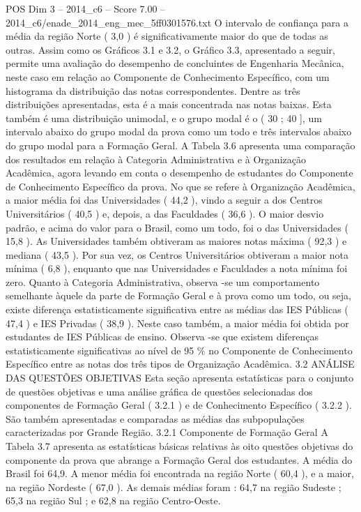 \begin{textsample}{POS Dim 3 – 2014\_c6 – Score 7.00 – 2014\_c6/enade\_2014\_eng\_mec\_5ff0301576.txt}
O intervalo de confiança para a média da região Norte ( 3,0 ) é significativamente maior do que de todas as outras.
Assim como os Gráficos 3.1 e 3.2, o Gráfico 3.3, apresentado a seguir, permite uma avaliação do desempenho de concluintes de Engenharia Mecânica, neste caso em relação ao Componente de Conhecimento Específico, com um histograma da distribuição das notas correspondentes.
Dentre as três distribuições apresentadas, esta é a mais concentrada nas notas baixas.
Esta também é uma distribuição unimodal, e o grupo modal é o ( 30 ; 40 ], um intervalo abaixo do grupo modal da prova como um todo e três intervalos abaixo do grupo modal para a Formação Geral.
A Tabela 3.6 apresenta uma comparação dos resultados em relação à Categoria Administrativa e à Organização Acadêmica, agora levando em conta o desempenho de estudantes do Componente de Conhecimento Específico da prova.
No que se refere à Organização Acadêmica, a maior média foi das Universidades ( 44,2 ), vindo a seguir a dos Centros Universitários ( 40,5 ) e, depois, a das Faculdades ( 36,6 ).
O maior desvio padrão, e acima do valor para o Brasil, como um todo, foi o das Universidades ( 15,8 ).
As Universidades também obtiveram as maiores notas máxima ( 92,3 ) e mediana ( 43,5 ).
Por sua vez, os Centros Universitários obtiveram a maior nota mínima ( 6,8 ), enquanto que nas Universidades e Faculdades a nota mínima foi zero.
Quanto à Categoria Administrativa, observa -se um comportamento semelhante àquele da parte de Formação Geral e à prova como um todo, ou seja, existe diferença estatisticamente significativa entre as médias das IES Públicas ( 47,4 ) e IES Privadas ( 38,9 ).
Neste caso também, a maior média foi obtida por estudantes de IES Públicas de ensino.
Observa -se que existem diferenças estatisticamente significativas ao nível de 95 \% no Componente de Conhecimento Específico entre as notas dos três tipos de Organização Acadêmica. 3.2 ANÁLISE DAS QUESTÕES OBJETIVAS Esta seção apresenta estatísticas para o conjunto de questões objetivas e uma análise gráfica de questões selecionadas dos componentes de Formação Geral ( 3.2.1 ) e de Conhecimento Específico ( 3.2.2 ).
São também apresentadas e comparadas as médias das subpopulações caracterizadas por Grande Região. 3.2.1 Componente de Formação Geral A Tabela 3.7 apresenta as estatísticas básicas relativas às oito questões objetivas do componente da prova que abrange a Formação Geral dos estudantes.
A média do Brasil foi 64,9.
A menor média foi encontrada na região Norte ( 60,4 ), e a maior, na região Nordeste ( 67,0 ).
As demais médias foram : 64,7 na região Sudeste ; 65,3 na região Sul ; e 62,8 na região Centro-Oeste.

\end{textsample}
